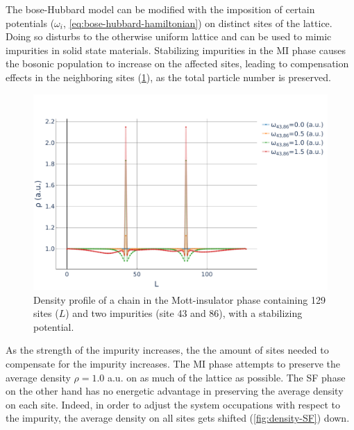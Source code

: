 \documentclass[twoside,twocolumn,9pt]{article}
\begin{document}
The bose-Hubbard model can be modified with the imposition of certain potentials ($\omega_i$, \cref{eq:bose-hubbard-hamiltonian}) on distinct sites of the lattice. Doing so disturbs to the otherwise uniform lattice and can be used to mimic impurities in solid state materials. Stabilizing impurities in the MI phase causes the bosonic population to increase on the affected sites, leading to compensation effects in the neighboring sites (\cref{fig:density-MI}), as the total particle number is preserved.
\begin{center}
  \begin{figure}
      \includegraphics[width=\linewidth]{../code/figures/Density-profiles-MI.pdf}
      \caption{Density profile of a chain in the Mott-insulator phase containing 129 sites ($L$) and two impurities (site 43 and 86), with a stabilizing potential.}
      \label{fig:density-MI}
  \end{figure}
\end{center}
As the strength of the impurity increases, the the amount of sites needed to compensate for the impurity increases. The MI phase attempts to preserve the average density $\rho=1.0$ a.u. on as much of the lattice as possible. The SF phase on the other hand has no energetic advantage in preserving the average density on each site. Indeed, in order to adjust the system occupations with respect to the impurity, the average density on all sites gets shifted (\cref{fig:density-SF}) down.
\end{document}
